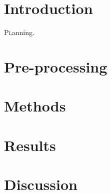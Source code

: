 \documentclass[twoside]{article}
\begin{document}
\begin{multicols}{2} %

\section{Introduction}
\lettrine[nindent=0em,lines=2]{P}lanning.


\section{Pre-processing}

\section{Methods}


\section{Results}

\section{Discussion}


\begin{thebibliography}{2} %

%
%

\end{thebibliography}


\end{multicols}
\end{document}
